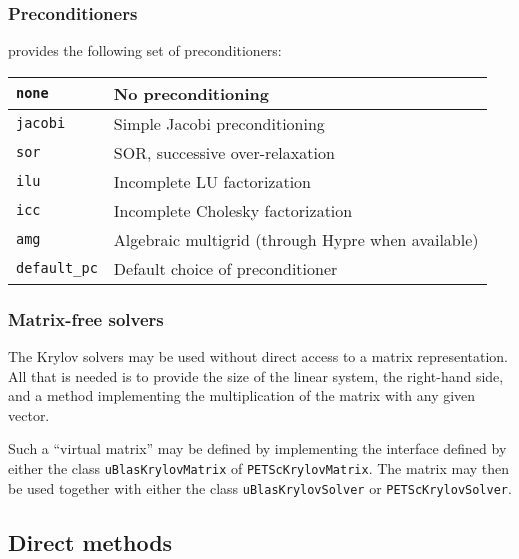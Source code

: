 \subsubsection{Preconditioners}

\dolfin{} provides the following set of preconditioners:

\begin{center}
\begin{tabular}{|l|l|}
\hline
\texttt{none}        & No preconditioning \\
\hline
\texttt{jacobi}      & Simple Jacobi preconditioning \\
\hline
\texttt{sor}         & SOR, successive over-relaxation \\
\hline
\texttt{ilu}         & Incomplete LU factorization \\
\hline
\texttt{icc}         & Incomplete Cholesky factorization \\
\hline
\texttt{amg}         & Algebraic multigrid (through Hypre when available) \\
\hline
\texttt{default\_pc} & Default choice of preconditioner \\
\hline
\end{tabular}
\end{center}

\subsubsection{Matrix-free solvers}

The \dolfin{} Krylov solvers may be used without direct access to a
matrix representation. All that is needed is to provide the
size of the linear system, the right-hand side, and a method
implementing the multiplication of the matrix with any given vector.

Such a ``virtual matrix'' may be defined by implementing the
interface defined by either the class \texttt{uBlasKrylovMatrix} of
\texttt{PETScKrylovMatrix}. The matrix may then be used together with
either the class \texttt{uBlasKrylovSolver} or \texttt{PETScKrylovSolver}.

\subsection{Direct methods}

